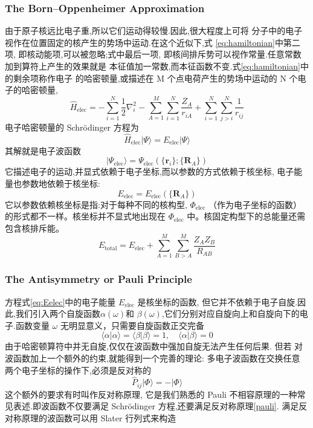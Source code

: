 \documentclass[fontset=none,12pt,a4paper]{ctexart}
\numberwithin{equation}{section}
\begin{document}
\subsubsection{The Born--Oppenheimer Approximation}
由于原子核远比电子重,所以它们运动得较慢.因此,很大程度上可将
分子中的电子视作在位置固定的核产生的势场中运动.在这个近似下,式
\eqref{eq:hamiltonian}中第二项, 即核动能项,可以被忽略;式中最后一项,
即核间排斥势可以视作常量.任意常数加到算符上产生的效果就是
本征值加一常数,而本征函数不变.式\eqref{eq:hamiltonian}中的剩余项称作电子
的哈密顿量,或描述在 M 个点电荷产生的势场中运动的 N 个电子的哈密顿量,
\begin{equation}
\hat{H}_{\mathrm{elec}}=-\sum_{i=1}^N\frac{1}{2}\nabla_i^2-
\sum_{A=1}^{M}\sum_{i=1}^N\frac{Z_A}{r_{iA}}+
\sum_{i=1}^{N}\sum_{j>i}^N\frac{1}{r_{ij}}  
\end{equation}
电子哈密顿量的 Schrödinger 方程为
\begin{equation}
  \hat{H}_{\mathrm{elec}} |\Psi\rangle = E_{\mathrm{elec}} |\Psi\rangle
\end{equation}
其解就是电子波函数
\begin{equation}
|\Psi_{\mathrm{elec}}\rangle=\Psi_{\mathrm{elec}}(\{\mathbf{r}_i\}; \{\mathbf{R}_A\})
\end{equation}
它描述电子的运动,并显式依赖于电子坐标,而以参数的方式依赖于核坐标,
电子能量也参数地依赖于核坐标:
\begin{equation}
  E_{\text{elec}} = E_{\text{elec}}(\{\mathbf{R}_A\})
  \label{eq:Eelec}
\end{equation}
它以参数依赖核坐标是指:对于每种不同的核构型, $\Phi_{\text{elec}}$
（作为电子坐标的函数）的形式都不一样。核坐标并不显式地出现在 $\Phi_{\text{elec}}$
中。核固定构型下的总能量还需包含核排斥能。
\begin{equation}
  E_{\text{total}} = E_{\text{elec}} +
   \sum_{A=1}^M\sum_{B>A}^M\frac{Z_AZ_B}{R_{AB}}
\end{equation}
\subsubsection{The Antisymmetry or Pauli Principle}
方程式\eqref{eq:Eelec}中的电子能量 $E_{\text{elec}}$ 是核坐标的函数,
 但它并不依赖于电子自旋.因此,我们引入两个自旋函数$\alpha(\omega)$和
 $\beta(\omega)$,它们分别对应自旋向上和自旋向下的电子.函数变量 $\omega$
 无明显意义，只需要自旋函数正交完备
\begin{equation}
  \langle \alpha | \alpha \rangle = \langle \beta | \beta \rangle = 1, \quad
  \langle \alpha | \beta \rangle = 0
\end{equation}
由于哈密顿算符中并无自旋,仅仅在波函数中强加自旋无法产生任何后果.
但若 对波函数加上一个额外的约束,就能得到一个完善的理论:
 多电子波函数在交换任意 两个电子坐标的操作下,必须是反对称的
\begin{equation}
  \hat{P}_{ij} |\Phi\rangle = -|\Phi\rangle
  \label{pauli}
\end{equation}
这个额外的要求有时叫作反对称原理, 它是我们熟悉的
 Pauli 不相容原理的一种常见表述.即波函数不仅要满足
  Schrödinger 方程,还要满足反对称原理\eqref{pauli}.
满足反对称原理的波函数可以用 Slater 行列式来构造
\end{document}

